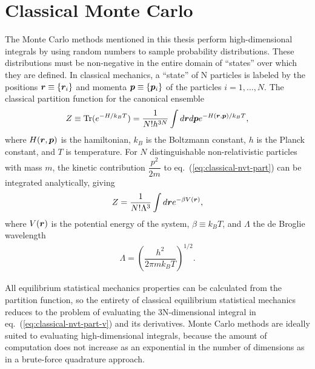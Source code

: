 \section{Classical Monte Carlo}
The Monte Carlo methods mentioned in this thesis perform high-dimensional integrals by using random numbers to sample probability distributions. These distributions must be non-negative in the entire domain of ``states'' over which they are defined. In classical mechanics, a ``state'' of N particles is labeled by the positions $\boldsymbol{r}\equiv\{\boldsymbol{r}_i\}$ and momenta $\boldsymbol{p}\equiv\{\boldsymbol{p}_i\}$ of the particles $i=1,\dots,N$. The classical partition function for the canonical ensemble
\begin{align} \label{eq:classical-nvt-part}
Z \equiv \text{Tr}(e^{-H/k_BT}) = \dfrac{1}{N!h^{3N}} \int d\boldsymbol{r} d\boldsymbol{p} e^{-H(\boldsymbol{r}, \boldsymbol{p})/k_BT},
\end{align}
where $H(\boldsymbol{r}, \boldsymbol{p})$ is the hamiltonian, $k_B$ is the Boltzmann constant, $h$ is the Planck constant, and $T$ is temperature. For $N$ distinguishable non-relativistic particles with mass $m$, the kinetic contribution $\dfrac{p^2}{2m}$ to eq.~(\ref{eq:classical-nvt-part}) can be integrated analytically, giving
\begin{align}\label{eq:classical-nvt-part-v}
Z = \dfrac{1}{N!\Lambda^{3}} \int d\boldsymbol{r} e^{-\beta V(\boldsymbol{r})},
\end{align}
where $V(\boldsymbol{r})$ is the potential energy of the system, $\beta\equiv k_BT$, and $\Lambda$ the de Broglie wavelength
\begin{align} \label{eq:debroglie}
\Lambda = \left(
\dfrac{h^2}{2\pi mk_BT}
\right)^{1/2}.
\end{align}

All equilibrium statistical mechanics properties can be calculated from the partition function, so the entirety of classical equilibrium statistical mechanics reduces to the problem of evaluating the 3N-dimensional integral in eq.~(\ref{eq:classical-nvt-part-v}) and its derivatives. Monte Carlo methods are ideally suited to evaluating high-dimensional integrals, because the amount of computation does not increase as an exponential in the number of dimensions as in a brute-force quadrature approach.

